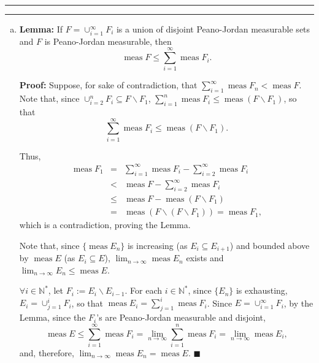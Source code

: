 \documentclass[11pt]{article}
\newcounter{questionCounter}
\newcounter{partCounter}[questionCounter]
\newenvironment{question}[2][\arabic{questionCounter}]{%
    \setcounter{partCounter}{0}%
    \vspace{.25in} \hrule \vspace{0.5em}%
        \noindent{\bf #2}%
    \vspace{0.8em} \hrule \vspace{.10in}%
    \addtocounter{questionCounter}{1}%
}{}
\renewcommand{\qed}{\quad $\blacksquare$}
\newcommand{\meas}{\operatorname{meas}}
\newcommand{\pjm}{Peano-Jordan measurable }
\begin{document}
\begin{question}{Problem 2}
\begin{enumerate}[(a)]
\item
{\bf Lemma:} If $F = \cup_{i = 1}^{\infty} F_i$ is a union of disjoint \pjm
sets and $F$ is Peano-Jordan measurable, then
\[\meas F \leq \sum_{i = 1}^{\infty} \meas F_i.\]

{\bf Proof:} Suppose, for sake of contradiction, that
$\sum_{i = 1}^{\infty} \meas F_n < \meas F$. Note that, since
$\cup_{i = 2}^n F_i \subseteq F\backslash F_1$,
$\sum_{i = 1}^n \meas F_i \leq \meas (F\backslash F_1)$, so that
\[\sum_{i = 1}^{\infty} \meas F_i \leq \meas (F\backslash F_1).\]

Thus,
\begin{eqnarray*}
\meas F_1
 & =    & \sum_{i = 1}^{\infty} \meas F_i - \sum_{i = 2}^{\infty} \meas F_i \\
 & <    & \meas F - \sum_{i = 2}^{\infty} \meas F_i \\
 & \leq & \meas F - \meas(F\backslash F_1) \\
 & =    & \meas (F\backslash(F\backslash F_1))
   =      \meas F_1,
\end{eqnarray*}
which is a contradiction, proving the Lemma.

Note that, since $\{\meas E_n\}$ is increasing (as
$E_i \subseteq E_{i + 1}$) and bounded above by $\meas E$ (as
$E_i \subseteq E$), $\lim_{n \rightarrow \infty} \meas E_n$ exists and
$\lim_{n \rightarrow \infty} E_n \leq \meas E$.

$\forall i \in \mathbb{N}^*$, let $F_i := E_i \backslash E_{i - 1}$. For each
$i \in \mathbb{N}^*$, since $\{E_n\}$ is exhausting,
$E_i = \cup_{j = 1}^i F_i$, so that $\meas E_i = \sum_{j = 1}^i \meas F_i$.
Since $E = \cup_{i = 1}^{\infty} F_i$, by the Lemma, since the $F_i$'s are
\pjm and disjoint,
\[\meas E
 \leq \sum_{i = 1}^{\infty} \meas F_i
 = \lim_{n \rightarrow \infty} \sum_{i = 1}^n \meas F_i
 = \lim_{n \rightarrow \infty} \meas E_i,\]
and, therefore, $\lim_{n \rightarrow \infty} \meas E_n = \meas E$. \qed


\end{enumerate}
\end{question}
\end{document}
